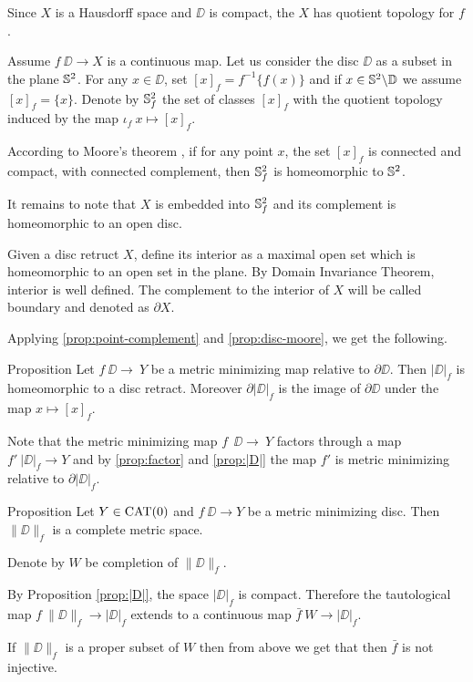 \documentclass[a4paper,10pt]{amsart}
\begin{document}
Since $X$ is a Hausdorff space and $\DD$ is compact, 
the $X$ has quotient topology for $f$. 

Assume $f\:\DD\to X$ is a continuous map.
Let us consider the disc $\DD$ as a subset in the plane $\mathbb{S}^2$.
For any $x\in \DD$, set $[x]_f=f^{-1}\{f(x)\}$
and
if $x\in \mathbb{S}^2\backslash \mathbb{D}$ we assume $[x]_f=\{x\}$.
Denote by $\mathbb{S}^2_f$ the set of classes $[x]_f$ with the quotient topology induced by the map $\iota_f\:x\mapsto [x]_f$.

According to Moore's theorem \cite{moore},
if for any point $x$, the set $[x]_f$ is connected and compact, with connected complement,
then $\mathbb{S}^2_f$ is homeomorphic to $\mathbb{S}^2$.

It remains to note that $X$ is embedded into $\mathbb{S}^2_f$ and its complement is homeomorphic to an open disc.\qeds

Given a disc retruct $X$,
define its interior as a maximal open set which is homeomorphic to an open set in the plane.
By Domain Invariance Theorem, interior is well defined.
The complement to the interior of $X$ will be called boundary and denoted as $\partial X$.

Applying \ref{prop:point-complement} and \ref{prop:disc-moore}, we get the following.

\begin{thm}{Proposition}\label{prop:|D|}
Let $f\:\DD\to\ Y$ be a metric minimizing map relative to $\partial \DD$.
Then $|\DD|_f$ is homeomorphic to a disc retract.
Moreover $\partial|\DD|_f$ is the image of $\partial \DD$
under the map $x\mapsto [x]_f$.
\end{thm}

Note that the metric minimizing map $f\:\:\DD\to\ Y$ factors through a map $f'\:|\DD|_f\to Y$
and by \ref{prop:factor} and \ref{prop:|D|} 
the map $f'$
is metric minimizing relative to $\partial|\DD|_f$.

\begin{thm}{Proposition}
Let $Y\in\mathop{\rm CAT}\nolimits(0)$ 
and 
$f\:\DD\to Y$ be a metric minimizing disc.
Then $\|\DD\|_f$ is a complete metric space.
\end{thm}

Denote by $W$ be completion of $\|\DD\|_f$.

By Proposition \ref{prop:|D|},
the space $|\DD|_f$ is compact.
Therefore the tautological map $f\:\|\DD\|_f\to |\DD|_f$ 
extends to a continuous map $\bar f\:W\to |\DD|_f$.

If $\|\DD\|_f$ is a proper subset of $W$ 
then from above we get that
then $\bar f$ is not injective.
\end{document}
